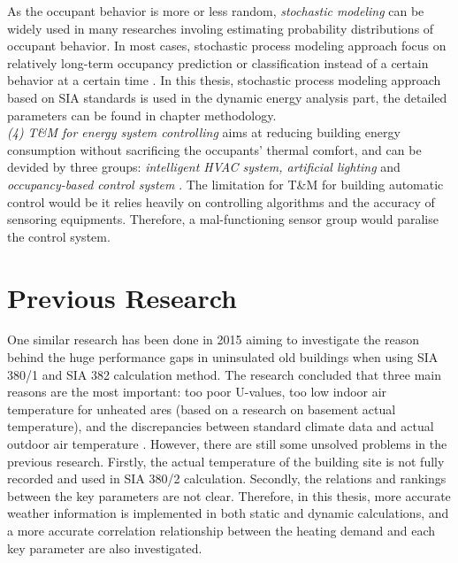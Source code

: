 \documentclass[a4paper, oneside]{discothesis}
\begin{document}
			As the occupant behavior is more or less random, \textit{stochastic modeling} can be widely used in many researches involing estimating probability distributions of occupant behavior. In most cases, stochastic process modeling approach focus on relatively long-term occupancy prediction or classification instead of a certain behavior at a certain time \cite{ZOU2018165}.
			In this thesis, stochastic process modeling approach based on SIA standards is used in the dynamic energy analysis part, the detailed parameters can be found in chapter methodology.\\

			\textit{(4) T\&M for energy system controlling} aims at reducing building energy consumption without sacrificing the occupants' thermal comfort, and can be devided by three groups: \textit{intelligent HVAC system, artificial lighting} and \textit{occupancy-based control system} \cite{ZOU2018165,hong2015review}. The limitation for T\&M for building automatic control would be it relies heavily on controlling algorithms and the accuracy of sensoring equipments. Therefore, a mal-functioning sensor group would paralise the control system.



		

	\section{Previous Research}
		 One similar research has been done in 2015 aiming to investigate the reason behind the huge performance gaps in uninsulated old buildings when using SIA 380/1 and SIA 382 calculation method. The research concluded that three main reasons are the most important: too poor U-values, too low indoor air temperature for unheated ares (based on a research on basement actual temperature), and the discrepancies between standard climate data and actual outdoor air temperature \cite{SIAPreviousreport}. However, there are still some unsolved problems in the previous research. Firstly, the actual temperature of the building site is not fully recorded and used in SIA 380/2 calculation. Secondly, the relations and rankings between the key parameters are not clear. Therefore, in this thesis, more accurate weather information is implemented in both static and dynamic calculations, and a more accurate correlation relationship between the heating demand and each key parameter are also investigated.
\end{document}
